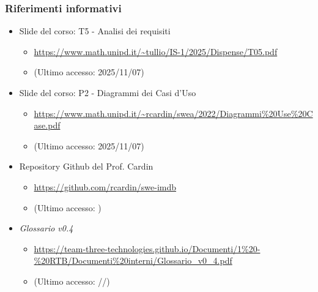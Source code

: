 \documentclass[a4paper,12pt]{article}
\begin{document}
{{            \subsubsection{Riferimenti informativi} {
                \begin{itemize}
                    \item Slide del corso: T5 - Analisi dei requisiti
                    \begin{itemize}
                        \item \url{https://www.math.unipd.it/~tullio/IS-1/2025/Dispense/T05.pdf}
                        \item[] (Ultimo accesso: 2025/11/07)
                    \end{itemize}
                    \item Slide del corso: P2 - Diagrammi dei Casi d'Uso
                    \begin{itemize}
                        \item \url{https://www.math.unipd.it/~rcardin/swea/2022/Diagrammi\%20Use\%20Case.pdf}
                        \item[] (Ultimo accesso: 2025/11/07)
                    \end{itemize}
                    \item Repository Github del Prof. Cardin
                    \begin{itemize}
                        \item \url{https://github.com/rcardin/swe-imdb}
                        \item[] (Ultimo accesso: )
                    \end{itemize}
                    \item \textit{Glossario v0.4}
                    \begin{itemize}
                        \item \url{https://team-three-technologies.github.io/Documenti/1%20-%20RTB/Documenti%20interni/Glossario_v0_4.pdf}
                        \item[] (Ultimo accesso: //)
                    \end{itemize}
                \end{itemize}
            }
        }
    }

    \newpage
\end{document}

